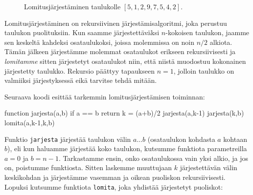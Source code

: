 \begin{figure}
\caption{Lomitusjärjestäminen taulukolle $[5,1,2,9,7,5,4,2]$.}
\label{fig:lomjar}
\end{figure}

Lomitusjärjestäminen on rekursiivinen järjestämisalgoritmi,
joka perustuu taulukon puolituksiin.
Kun saamme järjestettäväksi $n$-kokoisen taulukon,
jaamme sen keskeltä kahdeksi osataulukoksi,
joissa molemmissa on noin $n/2$ alkiota.
Tämän jälkeen järjestämme molemmat osataulukot erikseen rekursiivisesti
ja \emph{lomitamme} sitten järjestetyt osataulukot niin,
että niistä muodostuu kokonainen järjestetty taulukko.
Rekursio päättyy tapaukseen $n=1$, jolloin
taulukko on valmiiksi järjestyksessä eikä
tarvitse tehdä mitään.

Seuraava koodi esittää tarkemmin lomitusjärjestämisen toiminnan:

\begin{code}
function jarjesta(a,b)
    if a == b
        return
    k = (a+b)/2
    jarjesta(a,k-1)
    jarjesta(k,b)
    lomita(a,k-1,k,b)
\end{code}

Funktio \texttt{jarjesta} järjestää taulukon
välin $a \dots b$ (osataulukon kohdasta
$a$ kohtaan $b$), eli kun haluamme järjestää koko taulukon,
kutsumme funktiota parametreilla $a=0$ ja $b=n-1$.
Tarkastamme ensin, onko osataulukossa vain yksi alkio,
ja jos on, poistumme funktiosta.
Sitten laskemme muuttujaan $k$ järjestettävän välin keskikohdan
ja järjestämme vasemman ja oikean puoliskon rekursiivisesti.
Lopuksi kutsumme funktiota \texttt{lomita},
joka yhdistää järjestetyt puoliskot:

